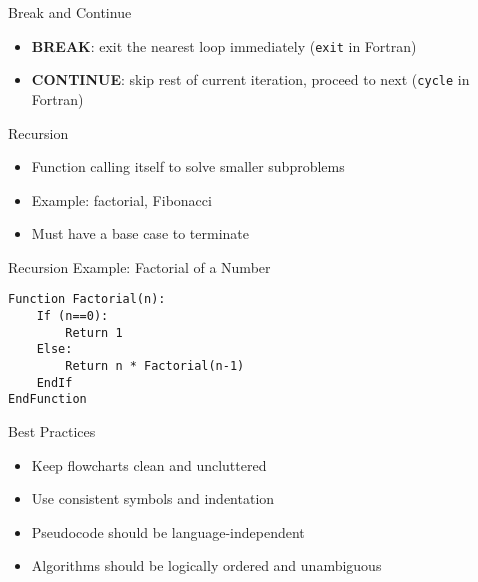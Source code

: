\documentclass[12pt, aspectratio=169]{beamer}
\begin{document}
    \begin{frame}{Break and Continue}
        \begin{itemize}
            \item \textbf{BREAK}: exit the nearest loop immediately (\texttt{exit} in Fortran)
            \item \textbf{CONTINUE}: skip rest of current iteration, proceed to next (\texttt{cycle} in Fortran)
        \end{itemize}
    \end{frame}


    \begin{frame}{Recursion}
        \begin{itemize}
            \item Function calling itself to solve smaller subproblems
            \item Example: factorial, Fibonacci
            \item Must have a base case to terminate
        \end{itemize}
    \end{frame}


    \begin{frame}[fragile]{Recursion Example: Factorial of a Number}
        \begin{verbatim}
Function Factorial(n):
    If (n==0):
        Return 1
    Else:
        Return n * Factorial(n-1)
    EndIf
EndFunction
        \end{verbatim}
    \end{frame}


    

    \begin{frame}{Best Practices}
    \begin{itemize}
        \item Keep flowcharts clean and uncluttered
        \item Use consistent symbols and indentation
        \item Pseudocode should be language-independent
        \item Algorithms should be logically ordered and unambiguous
    \end{itemize}
    \end{frame}
    
\end{document}
